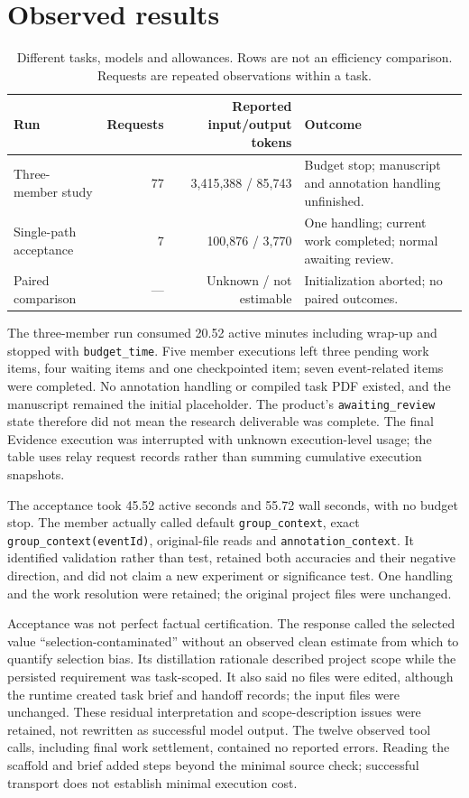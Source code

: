 \documentclass[11pt,a4paper]{article}
\begin{document}
\section{Observed results}
\begin{table}[ht]
\centering\small
\begin{tabularx}{\linewidth}{@{}lrrX@{}}
\toprule
Run & Requests & Reported input/output tokens & Outcome\\
\midrule
Three-member study & 77 & 3,415,388 / 85,743 & Budget stop; manuscript and annotation handling unfinished.\\
Single-path acceptance & 7 & 100,876 / 3,770 & One handling; current work completed; normal awaiting review.\\
Paired comparison & --- & Unknown / not estimable & Initialization aborted; no paired outcomes.\\
\bottomrule
\end{tabularx}
\caption{Different tasks, models and allowances. Rows are not an efficiency comparison. Requests are repeated observations within a task.}
\end{table}

The three-member run consumed 20.52 active minutes including wrap-up and stopped with \texttt{budget\_time}. Five member executions left three pending work items, four waiting items and one checkpointed item; seven event-related items were completed. No annotation handling or compiled task PDF existed, and the manuscript remained the initial placeholder. The product's \texttt{awaiting\_review} state therefore did not mean the research deliverable was complete. The final Evidence execution was interrupted with unknown execution-level usage; the table uses relay request records rather than summing cumulative execution snapshots.

The acceptance took 45.52 active seconds and 55.72 wall seconds, with no budget stop. The member actually called default \texttt{group\_context}, exact \texttt{group\_context(eventId)}, original-file reads and \texttt{annotation\_context}. It identified validation rather than test, retained both accuracies and their negative direction, and did not claim a new experiment or significance test. One handling and the work resolution were retained; the original project files were unchanged.

Acceptance was not perfect factual certification. The response called the selected value ``selection-contaminated'' without an observed clean estimate from which to quantify selection bias. Its distillation rationale described project scope while the persisted requirement was task-scoped. It also said no files were edited, although the runtime created task brief and handoff records; the input files were unchanged. These residual interpretation and scope-description issues were retained, not rewritten as successful model output. The twelve observed tool calls, including final work settlement, contained no reported errors. Reading the scaffold and brief added steps beyond the minimal source check; successful transport does not establish minimal execution cost.
\end{document}
